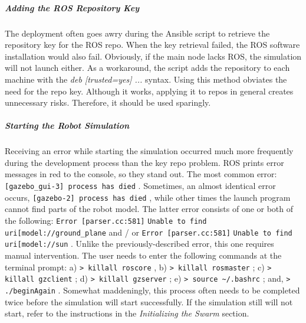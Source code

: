\documentclass[9pt,twocolumn,twoside]{../../styles/osajnl}
\begin{document}
\subparagraph{Adding the ROS Repository Key}
The deployment often goes awry during the Ansible script to retrieve the repository key for the ROS repo.  When the key retrieval failed, the ROS software installation would also fail.  Obviously, if the main node lacks ROS, the simulation will not launch either.  As a workaround, the script adds the repository to each machine with the \textit{deb [trusted=yes] ...} syntax.  Using this method obviates the need for the repo key.  Although it works, applying it to repos in general creates unnecessary risks.  Therefore, it should be used sparingly.  

\subparagraph{Starting the Robot Simulation}
Receiving an error while starting the simulation occurred much more frequently during the development process than the key repo problem.  ROS prints error messages in red to the console, so they stand out.  The most common error: {\color{red} \lstinline[style=BashInputStyle]![gazebo_gui-3] process has died! }.  Sometimes, an almost identical error occurs, {\color{red} \lstinline[style=BashInputStyle]![gazebo-2] process has died! }, while other times the launch program cannot find parts of the robot model.  The latter error consists of one or both of the following: {\color{red} \lstinline[style=BashInputStyle]!Error [parser.cc:581]! }{\lstinline[style=BashInputStyle]!Unable to find uri[model://ground_plane! } and / or {\color{red} \lstinline[style=BashInputStyle]!Error [parser.cc:581]! }{\lstinline[style=BashInputStyle]!Unable to find uri[model://sun! }.  Unlike the previously-described error, this one requires manual intervention.  The user needs to enter the following commands at the terminal prompt: a) {\color{green} \lstinline[style=BashInputStyle]!> killall roscore! }, b) {\color{green} \lstinline[style=BashInputStyle]!> killall rosmaster! }; c) {\color{green} \lstinline[style=BashInputStyle]!> killall gzclient! }; d) {\color{green} \lstinline[style=BashInputStyle]!> killall gzserver! }; e) {\color{green} \lstinline[style=BashInputStyle]!> source ~/.bashrc! }; and, {\color{green} \lstinline[style=BashInputStyle]!> ./beginAgain! }. Somewhat maddeningly, this process often needs to be completed twice before the simulation will start successfully.  If the simulation still will not start, refer to the instructions in the \textit{Initializing the Swarm} section.
\end{document}
